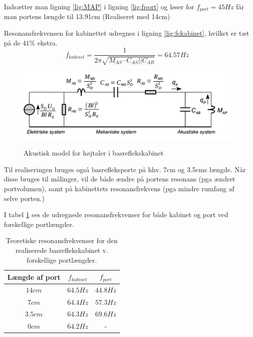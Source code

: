 Indsætter man ligning \ref{lig:MAP} i ligning \ref{lig:fport} og løser for $f_{port}=45Hz$ får man portens længde til 13.91cm (Realiseret med 14cm)


Resonansfrekvensen for kabinettet udregnes i ligning \ref{lig:fckabinet}, hvilket er tæt på de $41\%$ ekstra.
\begin{equation}\label{lig:fckabinet}
f_{kabinet}=\frac{1}{2 \pi \sqrt{M_{AS} \cdot C_{AS}||C_{AB}}} = 64.57Hz
\end{equation}
\begin{figure}[H]
	\centering
	\includegraphics[width=\textwidth]{Pics/Akustisk_basrefleks_model.PNG}
	\label{fig:BR_a_Model}
	\caption{Akustisk model for højtaler i basreflekskabinet \cite{Elektroakustik}} 
\end{figure}

Til realiseringen bruges også basrefleksporte på hhv. 7cm og 3.5cms længde. Når disse bruges til målinger, vil de både ændre på portens resonans (pga ændret portvolumen), samt på kabinettets resonansfrekvens (pga mindre rumfang af selve porten.)

I tabel \ref{tab:resonansfreq} ses de udregnede resonansfrekvenser for både kabinet og port ved forskellige portlængder.

\begin{table}[h]
	\centering
	\begin{tabular}{|c|c|c|}
		\hline	
		\textbf{Længde af port} & \textbf{$f_{kabinet}$} & \textbf{$f_{port}$} \\\hline
		$14cm$ & $64.5Hz$ & $44.8Hz$ \\\hline
		$7cm$ & $64.4Hz$ & $57.3Hz$ \\\hline
		$3.5cm$ & $64.3Hz$ & $69.6Hz$ \\\hline
		$0cm$ & $64.2Hz$ & - \\\hline
		
	\end{tabular}
	\label{tab:resonansfreq}
	\caption{Teoretiske resonansfrekvenser for den realiserede basreflekskabinet v. forskellige portlængder.}
\end{table} 